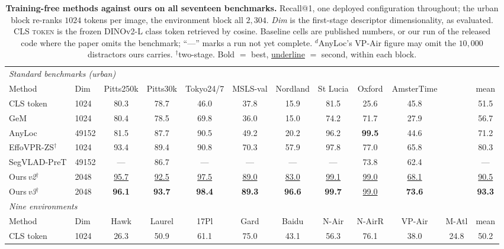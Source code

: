 \begin{table}[t]
\caption{\textbf{Training-free methods against ours on all seventeen benchmarks.} Recall@1, one deployed configuration throughout; the urban block re-ranks $1024$ tokens per image, the environment block all $2{,}304$. \emph{Dim} is the first-stage descriptor dimensionality, as evaluated. \textsc{CLS token} is the frozen DINOv2-L class token retrieved by cosine. Baseline cells are published numbers, or our run of the released code where the paper omits the benchmark; ``---'' marks a run not yet complete. $^{d}$AnyLoc's VP-Air figure may omit the $10{,}000$ distractors ours carries. $^{\dagger}$two-stage. Bold $=$ best, \underline{underline} $=$ second, within each block.}
\label{tab:breadth}
\centering
{\scriptsize\setlength{\tabcolsep}{2.0pt}\renewcommand{\arraystretch}{0.92}%
\begin{tabular}{ll ccccccccc|c}
\toprule
\multicolumn{12}{l}{\emph{Standard benchmarks (urban)}} \\
Method & Dim & Pitts250k & Pitts30k & Tokyo24/7 & MSLS-val & Nordland & St Lucia & Oxford & AmsterTime & & mean \\
\midrule
CLS token & 1024 & 80.3 & 78.7 & 46.0 & 37.8 & 15.9 & 81.5 & 25.6 & 45.8 &  & 51.5 \\
GeM & 1024 & 80.4 & 78.5 & 69.8 & 36.0 & 15.0 & 74.2 & 71.7 & 27.9 &  & 56.7 \\
AnyLoc & 49152 & 81.5 & 87.7 & 90.5 & 49.2 & 20.2 & 96.2 & \textbf{99.5} & 44.6 &  & 71.2 \\
EffoVPR-ZS$^{\dagger}$ & 1024 & 93.4 & 89.4 & 90.8 & 70.3 & 57.9 & 97.8 & 77.0 & 65.8 &  & 80.3 \\
SegVLAD-PreT & 49152 & --- & 86.7 & --- & --- & --- & --- & 73.8 & 62.4 &  & --- \\
\midrule
Ours\,\emph{v2}$^{\dagger}$ & 2048 & \underline{95.7} & \underline{92.5} & \underline{97.5} & \underline{89.0} & \underline{83.0} & \underline{99.1} & \underline{99.0} & \underline{68.1} &  & \underline{90.5} \\
Ours\,\emph{v3}$^{\dagger}$ & 2048 & \textbf{96.1} & \textbf{93.7} & \textbf{98.4} & \textbf{89.3} & \textbf{96.6} & \textbf{99.7} & \underline{99.0} & \textbf{73.6} &  & \textbf{93.3} \\
\midrule\midrule
\multicolumn{12}{l}{\emph{Nine environments}} \\
Method & Dim & Hawk & Laurel & 17Pl & Gard & Baidu & N-Air & N-AirR & VP-Air & M-Atl & mean \\
\midrule
CLS token & 1024 & 26.3 & 50.9 & 61.1 & 75.0 & 43.1 & 56.3 & 76.1 & 38.0 & 24.8 & 50.2 \\

\end{tabular}}
\end{table}
